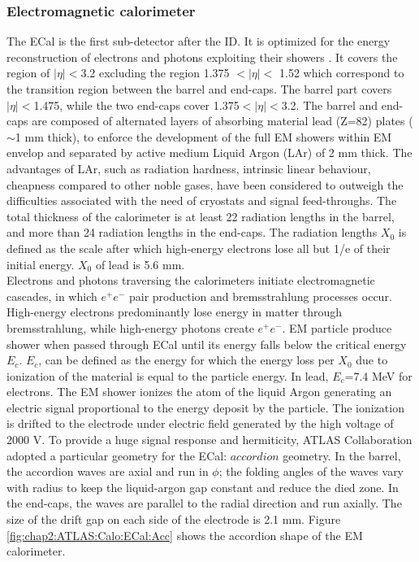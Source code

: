 \subsubsection{Electromagnetic calorimeter}
\label{chap2:ATLAS:Calo:ECAL}
The ECal is the first sub-detector after the ID. It is optimized for the energy reconstruction of electrons and photons exploiting their showers \cite{LAr_TRD}. It covers the region of $|\eta|<$3.2 excluding the region 1.375 $<|\eta|<$ 1.52 which correspond to the transition region between the barrel and end-caps. The barrel part covers $|\eta|<$1.475, while the two end-caps cover 1.375$<|\eta|<$3.2. The barrel and end-caps are composed of alternated layers of absorbing material lead (Z=82) plates ($\sim$1 mm thick), to enforce the development of the full EM showers within EM envelop and separated by active medium Liquid Argon (LAr) of 2 mm thick. The advantages of LAr, such as radiation hardness, intrinsic linear behaviour, cheapness compared to other noble gases, have been considered to outweigh the difficulties associated with the need of cryostats and signal feed-throughs. The total thickness of the calorimeter is at least 22 radiation lengths in the barrel, and more than 24 radiation lengths in the end-caps. The radiation lengths $X_0$ is defined as the scale after which high-energy electrons lose all but 1/e of their initial energy. $X_0$ of lead is 5.6 mm. \\
Electrons and photons traversing the calorimeters initiate electromagnetic cascades, in which $e^+e^-$ pair production and bremsstrahlung processes occur. High-energy electrons predominantly lose energy in matter through bremsstrahlung, while high-energy photons create $e^+e^-$. EM particle produce shower when passed through ECal until its energy falls below the critical energy $E_c$. $E_c$, can be defined as the energy for which the energy loss per $X_0$ due to ionization of the material is equal to the particle energy. In lead, $E_c$=7.4 MeV for electrons. The EM shower ionizes the atom of the liquid Argon generating an electric signal proportional to the energy deposit by the particle. The ionization is drifted to the electrode under electric field generated by the high voltage of 2000 V. To provide a huge signal response and hermiticity, ATLAS Collaboration adopted a particular geometry for the ECal: $accordion$ geometry. In the barrel, the accordion waves are axial and run in $\phi$; the folding angles of the waves vary with radius to keep the liquid-argon gap constant and reduce the died zone. In the end-caps, the waves are parallel to the radial direction and run axially. The size of the drift gap on each side of the electrode is 2.1 mm. Figure \ref{fig:chap2:ATLAS:Calo:ECal:Acc} shows the accordion shape of the EM calorimeter.
